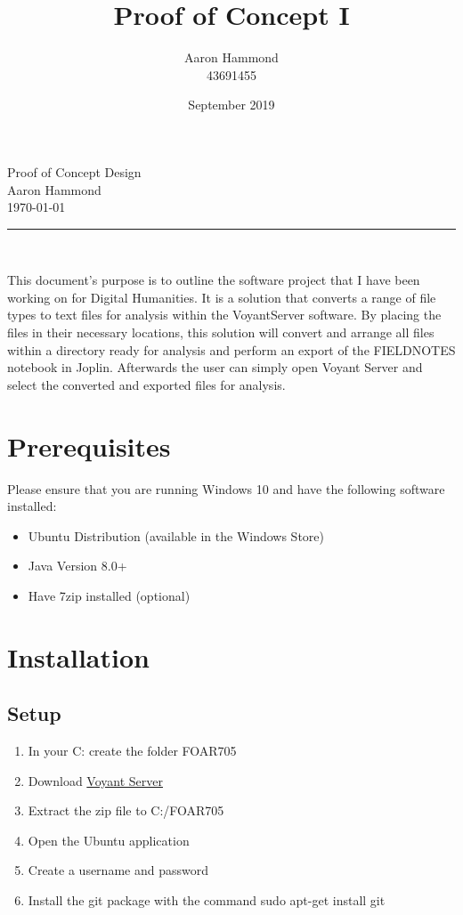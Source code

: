 \documentclass{article}
\title{Proof of Concept I}
\author{Aaron Hammond\\43691455}
\date{September 2019}
\newcommand\HRule{\rule{\textwidth}{1pt}} %
\begin{document}
\begin{center}
\huge{Proof of Concept Design}\\[0.4cm]
\huge{Aaron Hammond}\\[0.3cm]
\large{\today}\\[0.4cm]

\HRule \\[1cm]
\end{center}


This document's purpose is to outline the software project that I have been working on for Digital Humanities. It is a solution that converts a range of file types to text files for analysis within the VoyantServer software. By placing the files in their necessary locations, this solution will convert and arrange all files within a directory ready for analysis and perform an export of the FIELDNOTES notebook in Joplin. Afterwards the user can simply open Voyant Server and select the converted and exported files for analysis.

\section{Prerequisites}
Please ensure that you are running Windows 10 and have the following software installed:
\begin{itemize}
    \item Ubuntu Distribution (available in the Windows Store)
    \item Java Version 8.0+
    \item Have 7zip installed (optional)
    
\end{itemize}

\section{Installation}
\subsection{Setup}
\begin{enumerate}
    \item In your C: create the folder FOAR705
    \item Download \href{http://docs.voyant-tools.org/resources/run-your-own/voyant-server/#download}{Voyant Server}
    \item Extract the zip file to C:/FOAR705
    \item Open the Ubuntu application
    \item Create a username and password
    \item Install the git package with the command sudo apt-get install git
\end{enumerate}
\end{document}
